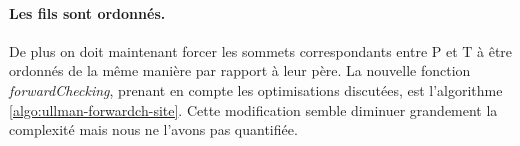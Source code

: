 
\paragraph{Les fils sont ordonnés.}
De plus on doit maintenant forcer les sommets correspondants entre P et T à être ordonnés de la même manière par rapport à leur père. 
La nouvelle fonction \emph{forwardChecking}, prenant en compte les optimisations discutées, est l'algorithme \ref{algo:ullman-forwardch-site}.
Cette modification semble diminuer grandement la complexité mais nous ne l'avons pas quantifiée.

